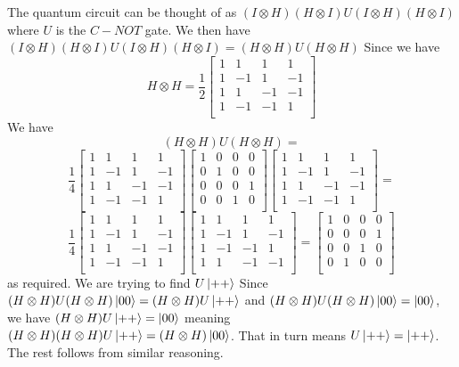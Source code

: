The quantum circuit can be thought of as $(I\otimes H)(H\otimes I)U(I\otimes H)(H\otimes I)$ where $U$ is the $C-NOT$ gate. We then have $(I\otimes H)(H\otimes I)U(I\otimes H)(H\otimes I) = (H\otimes H)U(H\otimes H)$
Since we have \[H\otimes H= \frac{1}{2}\begin{bmatrix}
    1 & 1 & 1 & 1 \\
    1 & -1 & 1 & -1\\
    1 & 1 & -1 & -1 \\
    1 & -1 & -1 & 1\\
\end{bmatrix}\]
We have \[(H\otimes H)U(H\otimes H) =\] \[\frac{1}{4}\begin{bmatrix}
    1 & 1 & 1 & 1 \\
    1 & -1 & 1 & -1\\
    1 & 1 & -1 & -1 \\
    1 & -1 & -1 & 1\\
\end{bmatrix}\begin{bmatrix}
    1 & 0 & 0 & 0 \\
    0& 1 & 0 & 0\\
    0 & 0 & 0 & 1 \\
    0 & 0 & 1 & 0\\
\end{bmatrix}\begin{bmatrix}
    1 & 1 & 1 & 1 \\
    1 & -1 & 1 & -1\\
    1 & 1 & -1 & -1 \\
    1 & -1 & -1 &1\\
\end{bmatrix} = \]
\[\frac{1}{4}\begin{bmatrix}
    1 & 1 & 1 & 1 \\
    1 & -1 & 1 & -1\\
    1 & 1 & -1 & -1 \\
    1 & -1 & -1 & 1\\
\end{bmatrix}\begin{bmatrix}
    1 & 1 & 1 & 1 \\
    1 & -1 & 1 & -1\\
    1 & -1 & -1 & 1 \\
    1 & 1 & -1 & -1\\
\end{bmatrix} =\begin{bmatrix}
    1 & 0 & 0 & 0 \\
    0 & 0 & 0 & 1\\
    0 & 0 & 1 & 0 \\
    0 & 1 & 0 & 0\\
\end{bmatrix}\] 
as required. We are trying to find $U\ket{++}$
Since $(H\otimes H)U(H\otimes H) \ket{00} = (H\otimes H)U\ket{++} $ and $ (H\otimes H)U(H\otimes H) \ket{00} = \ket{00}$, we have $(H\otimes H)U\ket{++} =  \ket{00}$ meaning $(H\otimes H)(H\otimes H)U\ket{++} =  (H\otimes H)\ket{00}$. That in turn means $U\ket{++} = \ket{++}$. The rest follows from similar reasoning.

